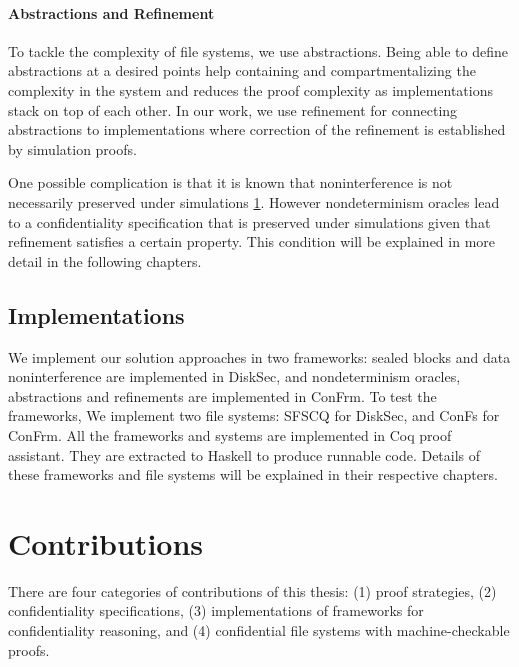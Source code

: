 \paragraph{Abstractions and Refinement}
To tackle the complexity of file systems, we use abstractions. Being able to define abstractions at a desired points help containing and compartmentalizing the complexity in the system and reduces the proof complexity as implementations stack on top of each other. In our work, we use refinement for connecting abstractions to implementations where correction of the refinement is established by simulation proofs.

One possible complication is that it is known that noninterference is not necessarily preserved under simulations \ref{}. However nondeterminism oracles lead to a confidentiality specification that is preserved under simulations given that refinement satisfies a certain property. This condition will be explained in more detail in the following chapters.


\subsection{Implementations}
We implement our solution approaches in two frameworks: sealed blocks and data noninterference are implemented in DiskSec, and nondeterminism oracles, abstractions and refinements are implemented in ConFrm. To test the frameworks, We implement two file systems: SFSCQ for DiskSec, and ConFs for ConFrm. All the frameworks and systems are implemented in Coq proof assistant. They are extracted to Haskell to produce runnable code. Details of these frameworks and file systems will be explained in their respective chapters.

\section{Contributions}
There are four categories of contributions of this thesis: (1) proof strategies, (2) confidentiality specifications, (3) implementations of frameworks for confidentiality reasoning, and (4) confidential file systems with machine-checkable proofs.

